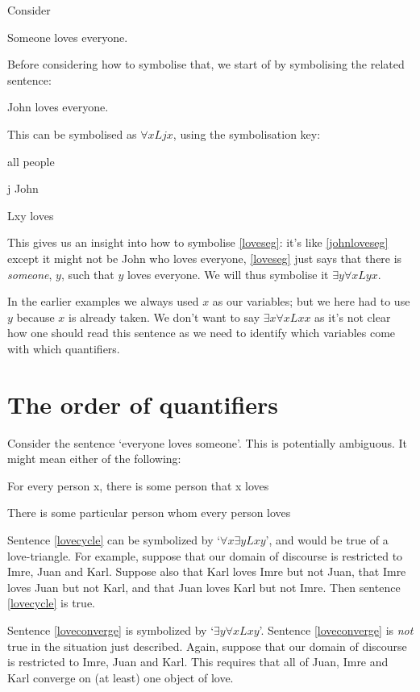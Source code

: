 Consider \begin{earg}
\item[\ex{loveseg}] Someone loves everyone.
\end{earg}
Before considering how to symbolise that, we start of by symbolising the related sentence: 
\begin{earg}
\item[\ex{johnloveseg}] John loves everyone.
\end{earg} This can be symbolised
as $\forall x Ljx$, using the symbolisation key:\begin{ekey}
\item[\text{domain}] all people
\item[j] John
\item[Lxy]  loves 
\end{ekey} 
This gives us an insight into how to symbolise \ref{loveseg}: it's like \ref{johnloveseg} except it might not be John who loves everyone, \ref{loveseg} just says that there is \emph{someone}, $y$, such that $y$ loves everyone. We will thus symbolise it $\exists y\forall x Lyx$.

In the earlier examples we always used $x$ as our variables; but we here had to use $y$ because $x$ is already taken. We don't want to say $\exists x\forall xLxx$ as it's not clear how one should read this sentence as we need to identify which variables come with which quantifiers. 


\section{The order of quantifiers}
Consider the sentence `everyone loves someone'. This is potentially ambiguous. It might mean either of the following:
	\begin{earg}
		\item[\ex{lovecycle}] For every person x, there is some person that x loves
		\item[\ex{loveconverge}] There is some particular person whom every person loves
	\end{earg}
Sentence \ref{lovecycle} can be symbolized by `$\forall x \exists y Lxy$', and would be true of a love-triangle. For example, suppose that our domain of discourse is restricted to Imre, Juan and Karl. Suppose also that Karl loves Imre but not Juan, that Imre loves Juan but not Karl, and that Juan loves Karl but not Imre. Then sentence \ref{lovecycle} is true. 

Sentence \ref{loveconverge} is symbolized by `$\exists y \forall x Lxy$'. Sentence \ref{loveconverge} is \emph{not} true in the situation just described. Again, suppose that our domain of discourse is restricted to Imre, Juan and Karl. This requires that all of Juan, Imre and Karl converge on (at least) one object of love. 

